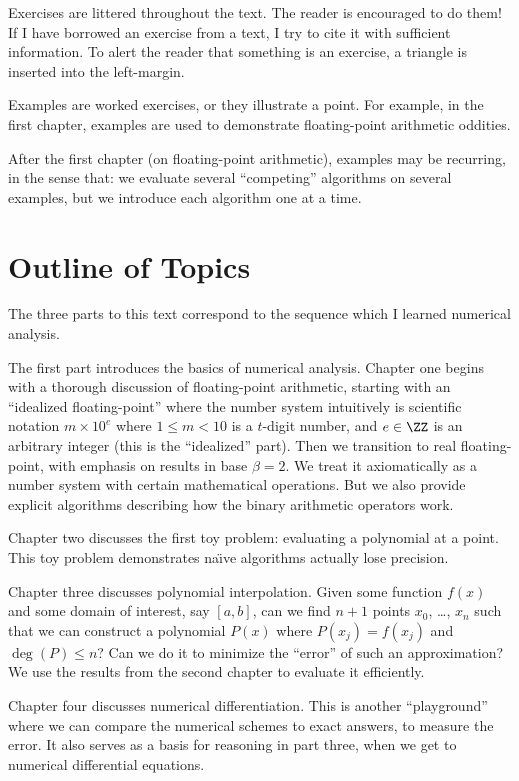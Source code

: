 Exercises are littered throughout the text. The reader is encouraged to
do them! If I have borrowed an exercise from a text, I try to cite it
with sufficient information. To alert the reader that something is an
exercise, a triangle is inserted into the left-margin.

Examples are worked exercises, or they illustrate a point. For example,
in the first chapter, examples are used to demonstrate floating-point
arithmetic oddities.

After the first chapter (on floating-point arithmetic), examples may be
recurring, in the sense that: we evaluate several ``competing''
algorithms on several examples, but we introduce each algorithm one at a
time.

\section*{Outline of Topics}

The three parts to this text correspond to the sequence which I learned
numerical analysis.

The first part introduces the basics of numerical analysis. Chapter one begins
with a thorough discussion of floating-point arithmetic, starting with
an ``idealized floating-point'' where the number system intuitively
is scientific notation $m\times 10^{e}$ where $1\leq m<10$ is a
$t$-digit number, and $e\in\ZZ$ is an arbitrary integer (this is the
``idealized'' part). Then we transition to real 
floating-point, with emphasis on results in base $\beta=2$. We treat it
axiomatically as a number system with certain mathematical
operations. But we also provide explicit algorithms describing how the
binary arithmetic operators work.

Chapter two discusses the first toy problem: evaluating a polynomial at
a point. This toy problem demonstrates na\"{\i}ve algorithms actually
lose precision.

Chapter three discusses polynomial interpolation. Given some function
$f(x)$ and some domain of interest, say $[a,b]$, can we find $n+1$ points
$x_{0}$, \dots, $x_{n}$ such that we can construct a polynomial $P(x)$
where $P(x_{j})=f(x_{j})$ and $\deg(P)\leq n$? Can we do it to minimize
the ``error'' of such an approximation? We use the results from the
second chapter to evaluate it efficiently.

Chapter four discusses numerical differentiation. This is another
``playground'' where we can compare the numerical schemes to exact
answers, to measure the error. It also serves as a basis for reasoning
in part three, when we get to numerical differential equations.

